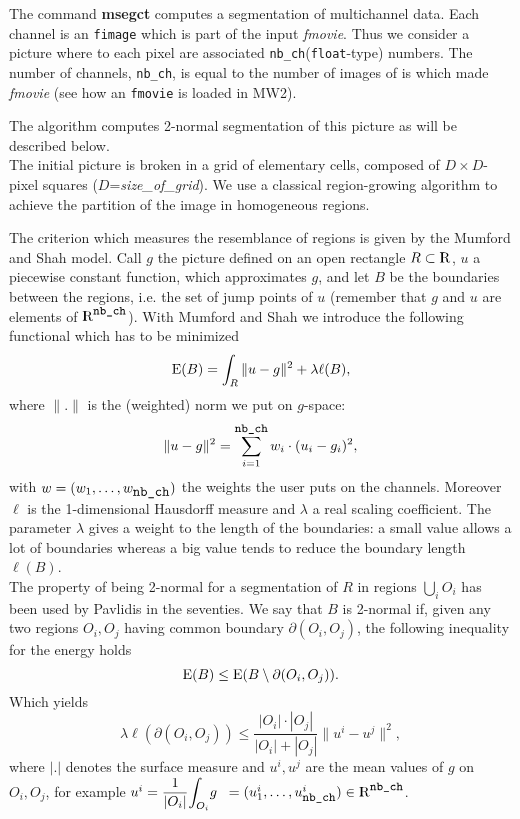 \def\Disp#1{{\displaystyle #1}}
\def\Dfrac#1#2{{\displaystyle \frac{#1}{#2}}}

\def\R{{\rm I\!\!R}}
\def\NC{{\tt nb\_ch}}

The command {\bf msegct} computes a segmentation of multichannel data.
Each channel is an {\tt fimage} which is part of the input {\em fmovie}.
Thus we consider a picture where to each pixel are associated 
\NC ({\tt float}-type) numbers. The number of channels,
\NC, is equal to the number of images of is which made {\em fmovie}
(see how an {\tt fmovie} is loaded in MW2).

The algorithm computes  2-normal segmentation of this picture 
as will be described below.\\
The initial picture is broken in a grid of elementary cells, composed of
$D\times D$-pixel squares ($D$={\em size\_of\_grid}). 
We use a classical region-growing algorithm to achieve the partition of the 
image in homogeneous regions.

The criterion which measures the resemblance of regions is given by the 
Mumford and Shah model. Call $g$ the picture defined on an open rectangle $R\subset\R$,
$u$ a piecewise constant function, which approximates $g$, and
let $B$ be the boundaries between the regions, i.e. the set of jump points of
$u$ (remember that $g$ and $u$ are elements of $\R^{\mbox{\small \NC}}$).
With Mumford and Shah we introduce the following functional which has
to be minimized
$$ {\rm E}(B)=\int_{R} \|u-g\|^{2} + \lambda\ell(B),$$
where $\|.\|$ is the (weighted) norm we put on $g$-space:
$$\|u-g\|^{2}=\sum_{i=1}^{\mbox{\small\NC}} w_i\cdot(u_i-g_i)^2,$$
with $w=(w_1,\ldots,w_{\mbox{\NC}})$ the weights the user puts on the channels.
Moreover $\ell$ is the 1-dimensional Hausdorff measure and $\lambda$ a real
scaling coefficient. The parameter $\lambda$ gives a weight to the length
of the boundaries: a small value allows a lot of boundaries whereas a big
value tends to reduce the boundary length $\ell(B)$.\\
The property of being 2-normal for a segmentation of $R$ in regions
$\Disp{\bigcup_{i}O_{i}}$ has been used by Pavlidis in the seventies.
We say that $B$ is 2-normal if, given any two regions $O_{i},O_{j}$ having
common boundary $\partial(O_{i},O_{j})$, the following inequality for
the energy holds 
$$ {\rm E}(B) \leq {\rm E}(B\setminus\partial(O_{i},O_{j})). $$
Which yields
$$ \lambda\ell(\partial(O_{i},O_{j}))\leq\frac{|O_{i}|\cdot |O_{j}|}{|O_{i}|+|O_{j}|}\|u^{i}-u^{j}\|^{2},$$
where $|.|$ denotes the surface measure and $u^{i},u^{j}$ are the mean values
of $g$ on $O_{i},O_{j}$, for example 
$u^{i}=\Dfrac{1}{|O_{i}|}\Disp{\int_{O_{i}}}g\;\;
=(u^i_1,\ldots,u^i_{\mbox{\small\NC}}) \in \R^{\mbox{\small\NC}}$.

